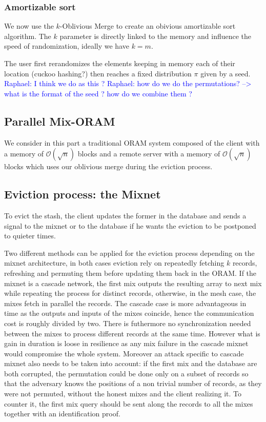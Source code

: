 \documentclass[english,oneside,twocolumn]{article}
\newcommand{\raphael}[1]{\textcolor{blue}{Raphael: #1}}
\begin{document}
\subsubsection{Amortizable sort}

We now use the $k$-Oblivious Merge to create an obivious amortizable sort algorithm. The $k$ parameter is directly linked to the memory and influence the speed of randomization, ideally we have $k=m$.

The user first rerandomizes the elements keeping in memory each of their location (cuckoo hashing?) then reaches a fixed distribution $\pi$ given by a seed.
\raphael{I think we do as this ?}
\raphael{how do we do the permutations? --> what is the format of the seed ? how do we combine them ?}


\subsection{Parallel Mix-ORAM}
We consider in this part a traditional ORAM system composed of the client with a memory of $\mathcal{O}\left(\sqrt{n}\right)$ blocks and a remote server with a memory of $\mathcal{O}\left(\sqrt{n}\right)$ blocks which uses our oblivious merge during the eviction process.


\subsection{Eviction process: the Mixnet}
To evict the stash, the client updates the former in the database and sends a signal to the mixnet or to the database if he wants the eviction to be postponed to quieter times.

Two different methods can be applied for the eviction process depending on the mixnet architecture, in both cases eviction rely on repeatedly fetching $k$ records, refreshing and permuting them before updating them back in the ORAM.
If the mixnet is a cascade network, the first mix outputs the resulting array to next mix while repeating the process for distinct records, otherwise, in the mesh case, the mixes fetch in parallel the records.
The cascade case is more advantageous in time as the outputs and inputs of the mixes coincide, hence the communication cost is roughly divided by two. There is futhermore no synchronization needed between the mixes to process different records at the same time.
However what is gain in duration is loose in resilience as any mix failure in the cascade mixnet would compromise the whole system. Moreover an attack specific to cascade mixnet also needs to be taken into account: if the first mix and the database are both corrupted, the permutation could be done only on a subset of records
so that the adversary knows the positions of a non trivial number of records, as they were not permuted, without the honest mixes and the client realizing it. To counter it, the first mix query should be sent along the records to all the mixes together with an identification proof.
\end{document}
